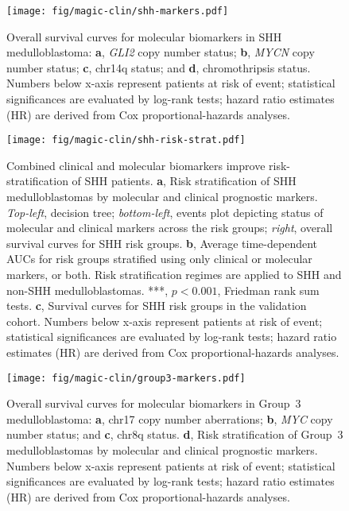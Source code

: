 \documentclass[11pt,letterpaper]{article}
\theoremstyle{definition}
\begin{document}
\begin{figure}[h]
	\begin{center}
		\texttt{[image: fig/magic-clin/shh-markers.pdf]}
	\end{center}
	\caption[Overall survival curves for molecular biomarkers in SHH medulloblastoma]
	{
	Overall survival curves for molecular biomarkers in SHH medulloblastoma:
	\textbf{a}, \emph{GLI2} copy number status;
	\textbf{b}, \emph{MYCN} copy number status;
	\textbf{c}, chr14q status; and
	\textbf{d}, chromothripsis status.
	Numbers below x-axis represent patients at risk of event; statistical significances are evaluated by log-rank tests; hazard ratio estimates (HR) are derived from Cox proportional-hazards analyses.
	}
	\label{fig:shh-markers}
\end{figure}

\begin{figure}[h]
	\begin{center}
		\texttt{[image: fig/magic-clin/shh-risk-strat.pdf]}
	\end{center}
	\caption[Combined clinical and molecular biomarkers improve risk-stratification of SHH patients]
	{
	Combined clinical and molecular biomarkers improve risk-stratification of SHH patients.
	\textbf{a}, Risk stratification of SHH medulloblastomas by molecular and clinical prognostic markers. \emph{Top-left}, decision tree; \emph{bottom-left}, events plot depicting status of molecular and clinical markers across the risk groups; \emph{right}, overall survival curves for SHH risk groups.
	\textbf{b}, Average time-dependent AUCs for risk groups stratified using only clinical or molecular markers, or both. Risk stratification regimes are applied to SHH and non-SHH medulloblastomas. ***, $p < 0.001$, Friedman rank sum tests.
	\textbf{c}, Survival curves for SHH risk groups in the validation cohort.
	Numbers below x-axis represent patients at risk of event; statistical significances are evaluated by log-rank tests; hazard ratio estimates (HR) are derived from Cox proportional-hazards analyses.
	}
	\label{fig:shh-risk-strat}
\end{figure}

\begin{figure}[h]
	\begin{center}
		\texttt{[image: fig/magic-clin/group3-markers.pdf]}
	\end{center}
	\caption[Overall survival curves for molecular biomarkers in Group~3 medulloblastoma]
	{
	Overall survival curves for molecular biomarkers in Group~3 medulloblastoma:
	\textbf{a}, chr17 copy number aberrations;
	\textbf{b}, \emph{MYC} copy number status; and 
	\textbf{c}, chr8q status.
	\textbf{d}, Risk stratification of Group~3 medulloblastomas by molecular and clinical prognostic markers.
	Numbers below x-axis represent patients at risk of event; statistical significances are evaluated by log-rank tests; hazard ratio estimates (HR) are derived from Cox proportional-hazards analyses.
	}
	\label{fig:group3-markers}
\end{figure}
\end{document}
